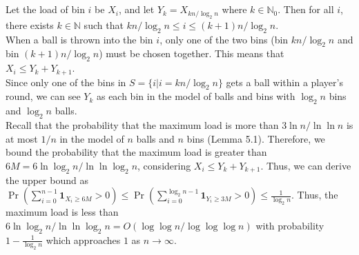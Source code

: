 \documentclass{article}
\begin{document}
\subsection{}
Let the load of bin $i$ be $X_i$, and let $Y_k=X_{kn/\log_2n}$ where $k\in\mathbb{N}_0$.
Then for all $i$, there exists $k\in \mathbb{N}$ such that $kn/\log_2 n \leq i \leq (k+1)n/\log_2 n$.\\
When a ball is thrown into the bin $i$, only one of the two bins (bin $kn/\log_2 n$ and bin $(k+1)n/\log_2 n$) must be chosen together. This means that $X_i \leq Y_k+Y_{k+1}$.\\
Since only one of the bins in $S=\{i|i=kn/\log_2 n\}$ gets a ball within a player's round, we can see $Y_k$ as each bin in the model of balls and bins with $\log_2 n$ bins and $\log_2 n$ balls.\\
Recall that the probability that the maximum load is more than $3\ln n/\ln\ln n$ is at most $1/n$ in the model of $n$ balls and $n$ bins (Lemma 5.1).
Therefore, we bound the probability that the maximum load is greater than $6M=6\ln \log_2 n / \ln\ln \log_2 n$, considering $X_i \leq Y_k + Y_{k+1}$.
Thus, we can derive the upper bound as $\Pr(\sum\limits_{i=0}^{n-1}\textbf{1}_{X_i\geq6M}>0)\leq\Pr(\sum\limits_{i=0}^{\log_2 n-1}\textbf{1}_{Y_i\geq 3M}>0)\leq \frac{1}{\log_2 n}$.
Thus, the maximum load is less than $6\ln \log_2 n / \ln\ln \log_2 n = O(\log\log n/\log\log\log n)$ with probability $1-\frac{1}{\log_2 n}$ which approaches $1$ as $n\rightarrow \infty$.
\subsection{}
\end{document}
